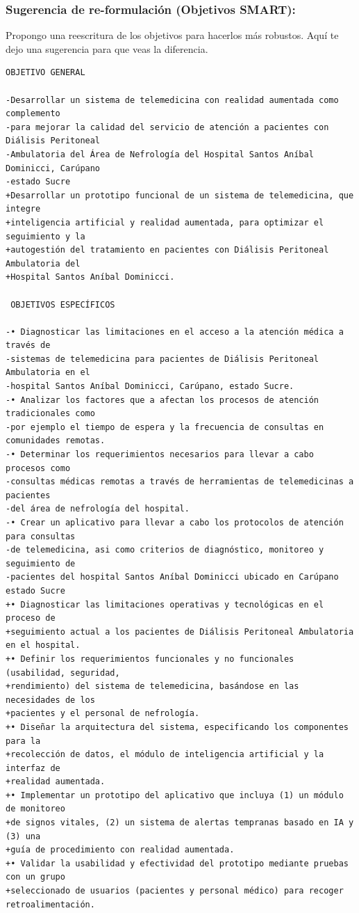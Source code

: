 \documentclass[12pt,a4paper]{article}
\begin{document}
\subsubsection*{Sugerencia de re-formulación (Objetivos SMART):}
Propongo una reescritura de los objetivos para hacerlos más robustos. Aquí te dejo una sugerencia 
para que veas la diferencia.

\begin{verbatim}
OBJETIVO GENERAL
 
-Desarrollar un sistema de telemedicina con realidad aumentada como complemento 
-para mejorar la calidad del servicio de atención a pacientes con Diálisis Peritoneal 
-Ambulatoria del Área de Nefrología del Hospital Santos Aníbal Dominicci, Carúpano 
-estado Sucre
+Desarrollar un prototipo funcional de un sistema de telemedicina, que integre 
+inteligencia artificial y realidad aumentada, para optimizar el seguimiento y la 
+autogestión del tratamiento en pacientes con Diálisis Peritoneal Ambulatoria del 
+Hospital Santos Aníbal Dominicci.
 
 OBJETIVOS ESPECÍFICOS
 
-• Diagnosticar las limitaciones en el acceso a la atención médica a través de 
-sistemas de telemedicina para pacientes de Diálisis Peritoneal Ambulatoria en el 
-hospital Santos Aníbal Dominicci, Carúpano, estado Sucre.
-• Analizar los factores que a afectan los procesos de atención tradicionales como 
-por ejemplo el tiempo de espera y la frecuencia de consultas en comunidades remotas.
-• Determinar los requerimientos necesarios para llevar a cabo procesos como 
-consultas médicas remotas a través de herramientas de telemedicinas a pacientes 
-del área de nefrología del hospital.
-• Crear un aplicativo para llevar a cabo los protocolos de atención para consultas 
-de telemedicina, asi como criterios de diagnóstico, monitoreo y seguimiento de 
-pacientes del hospital Santos Aníbal Dominicci ubicado en Carúpano estado Sucre
+• Diagnosticar las limitaciones operativas y tecnológicas en el proceso de 
+seguimiento actual a los pacientes de Diálisis Peritoneal Ambulatoria en el hospital.
+• Definir los requerimientos funcionales y no funcionales (usabilidad, seguridad, 
+rendimiento) del sistema de telemedicina, basándose en las necesidades de los 
+pacientes y el personal de nefrología.
+• Diseñar la arquitectura del sistema, especificando los componentes para la 
+recolección de datos, el módulo de inteligencia artificial y la interfaz de 
+realidad aumentada.
+• Implementar un prototipo del aplicativo que incluya (1) un módulo de monitoreo 
+de signos vitales, (2) un sistema de alertas tempranas basado en IA y (3) una 
+guía de procedimiento con realidad aumentada.
+• Validar la usabilidad y efectividad del prototipo mediante pruebas con un grupo 
+seleccionado de usuarios (pacientes y personal médico) para recoger retroalimentación.
\end{verbatim}
\end{document}
